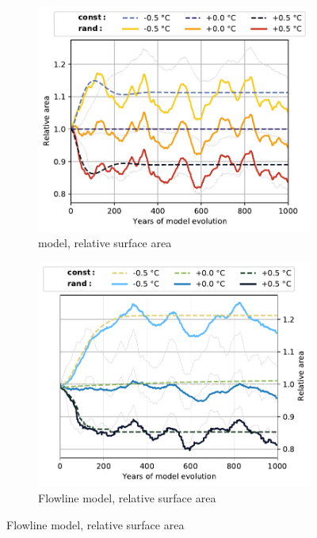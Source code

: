 \begin{figure}[p]
  \begin{subfigure}[b]{0.476\textwidth}
    \caption{\Vas{} model, relative surface area}
    \label{fig:Pasterze:area_vas}
    \centering
    \includegraphics[width=\textwidth]{../plots/final_plots/time_series/single_glaciers/area_norm_vas_Pasterze.pdf}
  \end{subfigure}
  \hfill
  \begin{subfigure}[b]{0.476\textwidth}
    \caption{Flowline model, relative surface area}
    \label{fig:Pasterze:area_fl}
    \centering
    \includegraphics[width=\textwidth]{../plots/final_plots/time_series/single_glaciers/area_norm_fl_Pasterze.pdf}
  \end{subfigure}


\end{figure}

